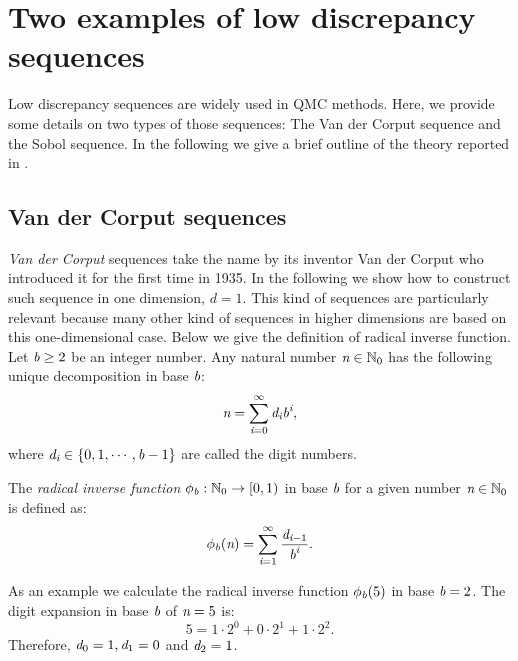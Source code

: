 \chapter{Two examples of low discrepancy sequences}\label{app:Sobol}
Low discrepancy sequences are widely used in QMC methods. Here, we provide some details on two types of those sequences: The Van der Corput sequence and the Sobol sequence.
In the following we give a brief outline of the theory reported in \cite{joe2008notes, leobacher2014introduction}.
\section{Van der Corput sequences}
\textit{Van der Corput} sequences take the name by its inventor Van der Corput who introduced it for the first time in 1935. In the following we show how to construct such sequence in one dimension, $d=1$. This kind of sequences are particularly relevant because many other kind of sequences in higher dimensions are based on this one-dimensional case. Below we give the definition of radical inverse function. \\ \indent 
Let $\textit{b}\geq 2$ be an integer number. Any natural number $\textit{n}\in \mathbb{N}_0$ has the following unique decomposition in base $\textit{b}$:
\begin{equation}
\textit{n} = \sum_{\textit{i}=0}^\infty \textit{d}_{\textit{i}}\textit{b}^{\textit{i}},
\end{equation}
where $\textit{d}_{\textit{i}} \in \{0, 1, \cdots, \textit{b}-1\}$ are called the digit numbers.
\begin{definition}
The \textit{radical inverse function} $\phi_{\textit{b}}:\mathbb{N}_0\rightarrow [0,1)$ in base $\textit{b}$ for a given number $\textit{n}\in \mathbb{N}_0$ is defined as:
\begin{equation}
\phi_{\textit{b}}(\textit{n}) = \sum_{\textit{i}=1}^{\infty}\frac{\textit{d}_{\textit{i}-1}}{\textit{b}^{\textit{i}}}.
\end{equation}
\end{definition}
As an example we calculate the radical inverse function $\phi_{\textit{b}}(5)$ in base $\textit{b} = 2$. 
The digit expansion in base $\textit{b}$ of $\textit{n}=5$ is:
\begin{equation}
5 = 1\cdot 2^0+0\cdot 2^1+1\cdot 2^2.
\end{equation}
Therefore, $\textit{d}_0 = 1, \textit{d}_1 = 0$ and $\textit{d}_2 = 1$. 
